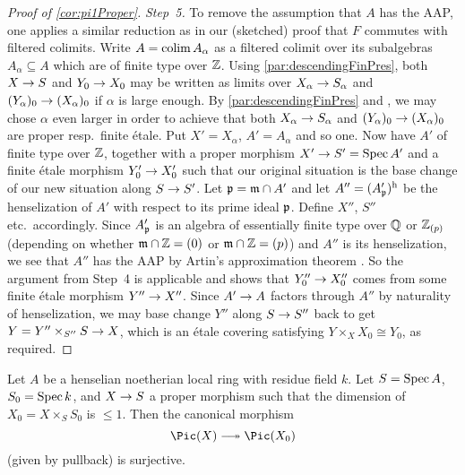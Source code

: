 \documentclass[a4paper, 10pt, oneside, DIV=9, chapterprefix=true, numbers=enddot, bibliography=totoc]{scrbook}
\begin{document}
\begin{proof}[Proof of \cref{cor:pi1Proper}]
	 \emph{Step~5.} To remove the assumption that $A$ has the AAP, one applies a similar reduction as in our (sketched) proof that $F$ commutes with filtered colimits. Write $A=\operatorname*{colim} A_\alpha$ as a filtered colimit over its subalgebras $A_\alpha\subseteq A$ which are of finite type over $\mathbb{Z}$. Using \cref{par:descendingFinPres}, both $X\morphism S$ and $Y_0\morphism X_0$ may be written as limits over $X_\alpha\morphism S_\alpha$ and $(Y_\alpha)_0\morphism (X_\alpha)_0$ if $\alpha$ is large enough. By \cref{par:descendingFinPres} and , we may chose $\alpha$ even larger in order to achieve that both $X_\alpha\morphism S_\alpha$ and $(Y_\alpha)_0\morphism (X_\alpha)_0$ are proper resp.\ finite étale. Put $X'=X_\alpha$, $A'=A_\alpha$ and so one. Now have $A'$ of finite type over $\mathbb{Z}$, together with a proper morphism $X'\morphism S'=\Spec A'$ and a finite étale morphism $Y_0'\morphism X_0'$ such that our original situation is the base change of our new situation along $S\morphism S'$. Let $\mathfrak{p}=\mathfrak{m}\cap A'$ and let $A''=(A'_{\mathfrak{p}})^{\mathrm{h}}$ be the henselization of $A'$  with respect to its prime ideal $\mathfrak{p}$. Define $X''$, $S''$ etc.\ accordingly. Since $A'_{\mathfrak{p}}$ is an algebra of essentially finite type over $\mathbb{Q}$ or $\mathbb{Z}_{(p)}$ (depending on whether $\mathfrak{m}\cap \mathbb{Z}=(0)$ or $\mathfrak{m}\cap \mathbb{Z}=(p)$) and $A''$ is its henselization, we see that $A''$ has the AAP by Artin's approximation theorem \cite[Theorem~(1.10)]{artinApprox}. So the argument from Step~4 is applicable and shows that $Y_0''\morphism X_0''$ comes from some finite étale morphism $Y''\morphism X''$. Since $A'\morphism A$ factors through $A''$ by naturality of henselization, we may base change $Y''$ along $S\morphism S''$ back to get $Y=Y''\times_{S''}S\morphism X$, which is an étale covering satisfying $Y\times_XX_0\cong Y_0$, as required.
\end{proof}
\begin{cor}\label{cor:PicEpi}
	Let $A$ be a henselian noetherian local ring with residue field $k$. Let $S=\operatorname{Spec} A$, $S_0=\operatorname{Spec} k$, and $X\morphism S$ a proper morphism such that the dimension of $X_0=X\times_SS_0$ is $\leq 1$. Then the canonical morphism
	\begin{equation*}
		\Pic(X)\epimorphism \Pic(X_0)
	\end{equation*}
	(given by pullback) is surjective.
\end{cor}
\end{document}
